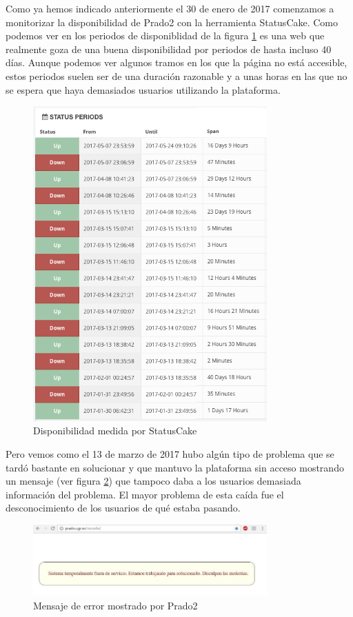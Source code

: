 Como ya hemos indicado anteriormente el 30 de enero de 2017 comenzamos a monitorizar la disponibilidad de Prado2 con la herramienta StatusCake. Como podemos ver en los periodos de disponiblidad de la figura \ref{fig:statuscake1} es una web que realmente goza de una buena disponibilidad por periodos de hasta incluso 40 días. Aunque podemos ver algunos tramos en los que la página no está accesible, estos periodos suelen ser de una duración razonable y a unas horas en las que no se espera que haya demasiados usuarios utilizando la plataforma.

\begin{figure}[h!]
\centering
\includegraphics[width=0.8\textwidth]{../screenshots/statuscake1}
\caption{Disponibilidad medida por StatusCake}
\label{fig:statuscake1}
\end{figure}

Pero vemos como el 13 de marzo de 2017 hubo algún tipo de problema que se tardó bastante en solucionar y que mantuvo la plataforma sin acceso mostrando un mensaje (ver figura \ref{fig:pradocaido}) que tampoco daba a los usuarios demasiada información del problema. El mayor problema de esta caída fue el desconocimiento de los usuarios de qué estaba pasando.

\begin{figure}[h!]
\centering
\includegraphics[width=0.8\textwidth]{../images/pradocaido}
\caption{Mensaje de error mostrado por Prado2}
\label{fig:pradocaido}
\end{figure}



